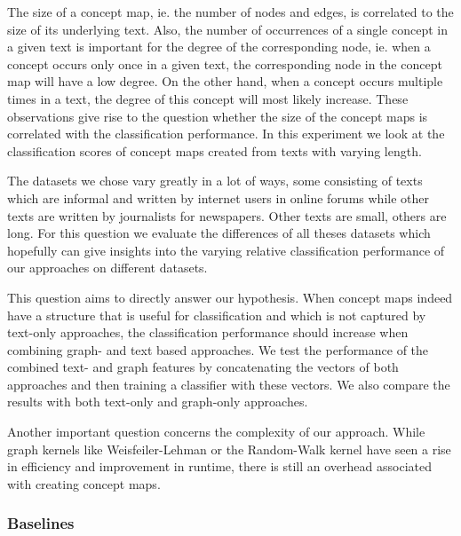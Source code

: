 The size of a concept map, ie. the number of nodes and edges, is correlated to the size of its underlying text.
Also, the number of occurrences of a single concept in a given text is important for the degree of the corresponding node, ie. when a concept occurs only once in a given text, the corresponding node in the concept map will have a low degree.
On the other hand, when a concept occurs multiple times in a text, the degree of this concept will most likely increase.
These observations give rise to the question whether the size of the concept maps is correlated with the classification performance.
In this experiment we look at the classification scores of concept maps created from texts with varying length.

The datasets we chose vary greatly in a lot of ways, some consisting of texts which are informal and written by internet users in online forums while other texts are written by journalists for newspapers.
Other texts are small, others are long.
For this question we evaluate the differences of all theses datasets which hopefully can give insights into the varying relative classification performance of our approaches on different datasets.

This question aims to directly answer our hypothesis. 
When concept maps indeed have a structure that is useful for classification and which is not captured by text-only approaches, the classification performance should increase when combining graph- and text based approaches.
We test the performance of the combined text- and graph features by concatenating the vectors of both approaches and then training a classifier with these vectors.
We also compare the results with both text-only and graph-only approaches.

Another important question concerns the complexity of our approach.
While graph kernels like Weisfeiler-Lehman or the Random-Walk kernel have seen a rise in efficiency and improvement in runtime, there is still an overhead associated with creating concept maps.

\subsubsection{Baselines}
